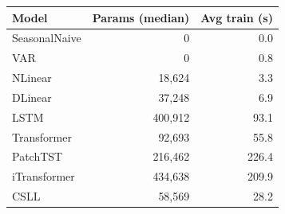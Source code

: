 \begin{tabular}{lrr}
\toprule
Model & Params (median) & Avg train (s) \\
\midrule
SeasonalNaive & 0 & 0.0 \\
VAR & 0 & 0.8 \\
NLinear & 18,624 & 3.3 \\
DLinear & 37,248 & 6.9 \\
LSTM & 400,912 & 93.1 \\
Transformer & 92,693 & 55.8 \\
PatchTST & 216,462 & 226.4 \\
iTransformer & 434,638 & 209.9 \\
CSLL & 58,569 & 28.2 \\
\bottomrule
\end{tabular}